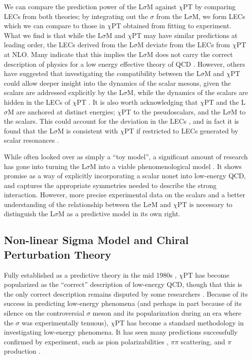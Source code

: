 \documentclass[aps,prd,onecolumn,showpacs,amsmath,amssymb,nofootinbib]{revtex4} \pdfoutput=1
\newcommand{\lsm}{L$\sigma$M}
\newcommand{\cpt}{$\chi$PT}
\begin{document}
We can compare the prediction power of the {\lsm} against {\cpt} by comparing LECs from both theories; by integrating out the $\sigma$ from the {\lsm}, we form LECs which we can compare to those in {\cpt} obtained from fitting to experiment. What we find is that while the {\lsm} and {\cpt} may have similar predictions at leading order, the LECs derived from the {\lsm} deviate from the LECs from {\cpt} at NLO. Many indicate that this implies the {\lsm} does not carry the correct description of physics for a low energy effective theory of QCD \cite{Donoghue1992,Pelaez2011}. However, others have suggested that investigating the compatibility between the {\lsm} and {\cpt} could allow deeper insight into the dynamics of the scalar mesons, given the scalars are addressed explicitly by the {\lsm}, while the dynamics of the scalars are hidden in the LECs of {\cpt} \cite{Tornqvist1999,Bramon2004}. It is also worth acknowledging that {\cpt} and the {\lsm} are anchored at distinct energies; {\cpt} to the pseudoscalars, and the {\lsm} to the scalars. This could account for the deviation in the LECs \cite{Tornqvist1999}, and in fact it is found that the {\lsm} is consistent with {\cpt} if restricted to LECs generated by scalar resonances \cite{Bramon2004}.

While often looked over as simply a ``toy model'', a significant amount of research has gone into turning the {\lsm} into a viable phenomenological model \cite{Napsuciale1998, Napsuciale2001,Tornqvist1999,tHooft2008,Black2001,Scadron2013,Fariborz2018}. It shows promise as a way of explicitly incorporating a scalar nonet into low-energy QCD, and captures the appropriate symmetries needed to describe the strong interaction. However, more precise experimental data on the scalars and a better understanding of the relationship between the {\lsm} and {\cpt} is necessary to distinguish the {\lsm} as a predictive model in its own right.

\subsection{Non-linear Sigma Model and Chiral Perturbation Theory}  
Fully established as a predictive theory in the mid 1980s \cite{Gasser1984}, {\cpt} has become popularized as the ``correct'' description of low-energy QCD, though that this is the only correct description remains disputed by some researchers \cite{Tornqvist1999}. Because of its success in predicting low-energy phenomena (and perhaps in part because of its silence on the controversial $\sigma$ meson and its popularization during an era where the $\sigma$ was experimentally tenuous), {\cpt} has become a standard methodology in investigating low-energy phenomena. It has seen many predictions successfully confirmed by experiment, such as pion polarizabilities \cite{Scherer2006}, $\pi\pi$ scattering, and $\pi$ production \cite{Merkel2004}.
\end{document}
